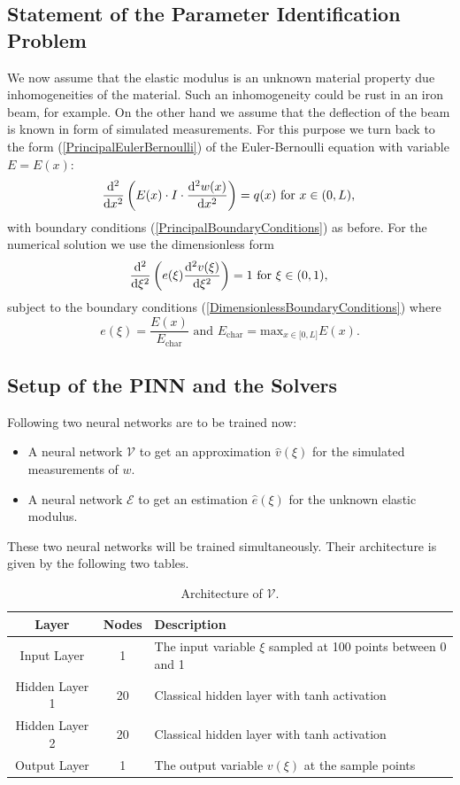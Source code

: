 \documentclass[a4paper,11pt]{article}
\begin{document}
\subsection*{Statement of the Parameter Identification Problem}
We now assume that the elastic modulus is an unknown material property due inhomogeneities of the material. Such an inhomogeneity could be rust in an iron beam, for example. On the other hand we assume that the deflection of the beam is known in form of simulated measurements. For this purpose we turn back to the form (\ref{PrincipalEulerBernoulli}) of the Euler-Bernoulli equation with variable $E = E(x) $:
$$
\frac{\mathrm{d}^2}{\mathrm{d}x^2} \left( E(x)\cdot I \cdot \frac{\mathrm{d}^2 w(x)}{\mathrm{d}x^2} \right) = q(x) \text{ for } x \in (0,L),\\
$$
with boundary conditions (\ref{PrincipalBoundaryConditions}) as before. For the numerical solution we use the dimensionless form
\begin{equation} \label{DimensionlessEulerBernoulli}
\frac{\mathrm{d}^2}{\mathrm{d}\xi^2}\left( e(\xi ) \frac{\mathrm{d}^2 v(\xi)}{\mathrm{d}\xi^2} \right)  = 1 \text{ for } \xi \in (0,1),\\
\end{equation}
subject to the boundary conditions (\ref{DimensionlessBoundaryConditions}) where
\begin{equation*}
e(\xi ) = \frac{E( x ) }{E_{\mathrm{char}}}\text{ and } E_{\mathrm{char}} = \mathrm{max}_{x\in \lbrack 0, L \rbrack } E(x) .
\end{equation*}

\subsection*{Setup of the PINN and the Solvers}

Following \cite{teloli2024solving} two neural networks are to be trained now:
\begin{itemize}
\item
A neural network $\mathscr{V}$ to get an approximation $\hat{v} (\xi ) $ for the simulated measurements of $w$.
\item
A neural network $\mathscr{E}$ to get an estimation $\hat{e} (\xi) $ for the unknown elastic modulus.
\end{itemize}
These two neural networks will be trained simultaneously. Their architecture is given by the following two tables.
\begin{table}[h!]
\centering
\begin{tabular}{ccl}
\toprule
\textbf{Layer} & \textbf{Nodes} & \textbf{Description}\\
\midrule
Input Layer & 1 & The input variable $\xi $ sampled at 100 points between 0 and 1\\
Hidden Layer 1 & 20 & Classical hidden layer with tanh activation\\
Hidden Layer  2& 20 & Classical hidden layer with tanh activation\\
Output Layer & 1 & The output variable $v(\xi ) $ at the sample points\\
\bottomrule
\end{tabular}
\caption{Architecture of $\mathscr{V}$.}
\end{table}
\end{document}
